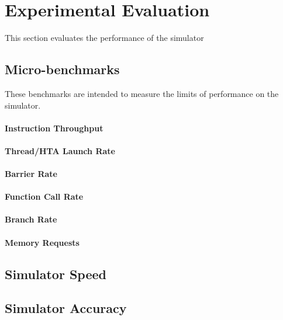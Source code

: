 \documentclass[conference, 10pt]{IEEEtran}
\begin{document}
\section{Experimental Evaluation}
\label{sec:experiments}

This section evaluates the performance of the simulator 


\subsection{Micro-benchmarks}

These benchmarks are intended to measure the limits of performance on the
simulator.

\paragraph{Instruction Throughput}

\paragraph{Thread/HTA Launch Rate}

\paragraph{Barrier Rate}

\paragraph{Function Call Rate}

\paragraph{Branch Rate}

\paragraph{Memory Requests}

\subsection{Simulator Speed}

\subsection{Simulator Accuracy}
\end{document}
